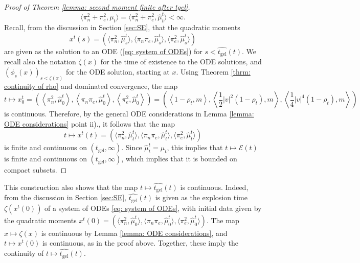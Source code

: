 \begin{proof}[Proof of Theorem \ref{lemma: second moment finite after tgel}]
\begin{equation}
   \langle \pi_n^2+ \pi_e^2, \mu_t\rangle = \langle \pi_n^2+\pi_e^2, \widehat{\mu}^t_{t}\rangle <\infty.
\end{equation} Recall, from the discussion in Section \ref{sec:SE}, that the quadratic moments \begin{equation} x^t(s)=\left(\langle \pi_n^2, \widehat{\mu}^t_s\rangle,\langle \pi_n\pi_e, \widehat{\mu}^t_s\rangle,\langle \pi_e^2, \widehat{\mu}^t_s\rangle\right) \end{equation} are given as the solution to an ODE (\ref{eq: system of ODEs}) for $s<\widehat{t_\text{gel}}(t)$. We recall also the notation $\zeta(x)$ for the time of existence to the ODE solutions, and $(\phi_s(x))_{s<\zeta(x)}$ for the ODE solution, starting at $x$. Using Theorem \ref{thrm: continuity of rho} and dominated convergence, the map \begin{equation}
    t\mapsto x^t_0=\left(\left\langle \pi_n^2, \widehat{\mu}^t_0\right\rangle,\left\langle \pi_n\pi_e, \widehat{\mu}^t_0\right\rangle,\left\langle \pi_e^2, \widehat{\mu}^t_0\right\rangle\right)=\left(\left\langle 1-\rho_t,m\right\rangle,\left\langle \frac{1}{2}|v|^2(1-\rho_t),m\right\rangle,\left\langle \frac{1}{4}|v|^4(1-\rho_t),m\right\rangle\right)
\end{equation} is continuous. Therefore, by the general ODE considerations in Lemma \ref{lemma: ODE considerations} point ii)., it follows that the map \begin{equation}
    t\mapsto x^t(t)= \left(\langle \pi_n^2, \widehat{\mu}^t_t\rangle,\langle \pi_n\pi_e, \widehat{\mu}^t_t\rangle,\langle \pi_e^2, \widehat{\mu}^t_t\rangle\right)
\end{equation} is finite and continuous on $(t_\text{gel}, \infty).$  Since $\widehat{\mu}^t_t=\mu_t$, this implies that $t\mapsto \mathcal{E}(t)$ is finite and continuous on $(t_\text{gel}, \infty)$, which implies that it is bounded on compact subsets. \end{proof}

\begin{remark} This construction also shows that the map $t\mapsto \widehat{t_\text{gel}}(t)$ is continuous. Indeed, from the discussion in Section \ref{sec:SE}, $\widehat{t_\text{gel}}(t)$ is given as the explosion time $\zeta(x^t(0))$ of a system of ODEs \ref{eq: system of ODEs}, with initial data given by the quadratic moments $x^t(0)=(\langle \pi_n^2, \widehat{\mu}^t_0\rangle,\langle \pi_n\pi_e, \widehat{\mu}^t_0\rangle,\langle \pi_e^2, \widehat{\mu}^t_0\rangle)$. The map $x\mapsto \zeta(x)$ is continuous by Lemma \ref{lemma: ODE considerations}, and $t\mapsto x^t(0)$ is continuous, as in the proof above. Together, these imply the continuity of $t\mapsto \widehat{t_\text{gel}}(t)$. \end{remark}

